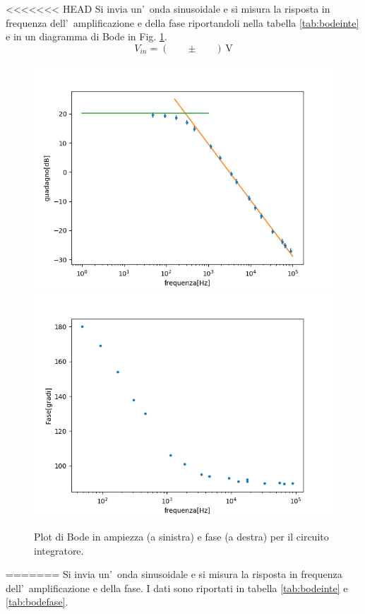 \documentclass[10pt,a4paper]{article}
\newcommand{\exn}{\phantom{xxx}}
\begin{document}
<<<<<<< HEAD
	Si invia un'~onda sinusoidale e si misura la risposta in frequenza dell'~amplificazione e della fase riportandoli 
	nella tabella \ref{tab:bodeinte} e in un diagramma di Bode in Fig. \ref{fig:bodeinte}. 
	\[
	V_{in} = (\exn \pm \exn )\,\mathrm{V}
	\]
	\begin{figure}[h]
	\begin{center}
		
		\includegraphics[scale=0.5]{bodefrequenza.png}		\includegraphics[scale=0.5]{fase.png}
		
		
	\end{center}
	\caption{\small Plot di Bode in ampiezza (a sinistra) e fase (a destra) per il circuito integratore.}
	\label{fig:bodeinte}
\end{figure}
=======
	Si invia un'~onda sinusoidale e si misura la risposta in frequenza dell'~amplificazione e della fase.
	I dati sono riportati in tabella \ref{tab:bodeinte} e \ref{tab:bodefase}.
\end{document}
